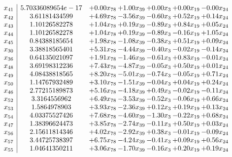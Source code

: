 \documentclass[8pt]{article}
\begin{document}
\[\begin{array}{c| c c@{\hskip 2pt} c@{\hskip 2pt} c@{\hskip 2pt} c@{\hskip 2pt} c@{\hskip 2pt} }
 x_{41}   &  5.70336089654e-17 & +  0.00 x_{78} & +  1.00 x_{39} & +  0.00 x_{3} & +  0.00 x_{19} & -0.00 x_{24}\\
 x_{42}   &  3.61181434599 & +  4.69 x_{78} & -3.56 x_{39} & -0.60 x_{3} & +  0.52 x_{19} & +  0.14 x_{24}\\
 x_{43}   &  1.10126582278 & +  1.04 x_{78} & +  0.19 x_{39} & -0.89 x_{3} & +  0.84 x_{19} & +  0.05 x_{24}\\
 x_{44}   &  1.10126582278 & +  1.04 x_{78} & +  0.19 x_{39} & -0.89 x_{3} & -0.16 x_{19} & +  1.05 x_{24}\\
 x_{45}   &  0.84388185654 & +  1.98 x_{78} & -1.08 x_{39} & -0.38 x_{3} & +  0.51 x_{19} & +  0.09 x_{24}\\
 x_{30}   &  3.38818565401 & +  5.31 x_{78} & -4.44 x_{39} & -0.40 x_{3} & -0.02 x_{19} & -0.14 x_{24}\\
 x_{36}   &  0.64135021097 & +  1.91 x_{78} & -1.46 x_{39} & -0.61 x_{3} & +  0.83 x_{19} & -0.01 x_{24}\\
 x_{48}   &  3.69198312236 & +  7.43 x_{78} & -4.87 x_{39} & -0.05 x_{3} & +  0.50 x_{19} & +  0.01 x_{24}\\
 x_{49}   &  4.08438818565 & +  8.20 x_{78} & -5.01 x_{39} & -0.74 x_{3} & -0.05 x_{19} & +  0.71 x_{24}\\
 x_{50}   &  1.14767932489 & +  3.10 x_{78} & -1.51 x_{39} & -0.04 x_{3} & +  0.04 x_{19} & +  0.24 x_{24}\\
 x_{46}   &  2.77215189873 & +  5.16 x_{78} & -4.18 x_{39} & +  0.49 x_{3} & -0.02 x_{19} & -0.11 x_{24}\\
 x_{52}   &  3.3164556962 & +  6.49 x_{78} & -3.53 x_{39} & -0.52 x_{3} & -0.06 x_{19} & +  0.66 x_{24}\\
 x_{53}   &  1.5864978903 & +  3.93 x_{78} & -2.36 x_{39} & +  0.12 x_{3} & +  0.19 x_{19} & +  0.13 x_{24}\\
 x_{54}   &  4.03375527426 & +  7.68 x_{78} & -4.60 x_{39} & -1.30 x_{3} & -0.22 x_{19} & +  0.68 x_{24}\\
 x_{47}   &  1.38396624473 & +  3.85 x_{78} & -2.74 x_{39} & -0.11 x_{3} & +  0.50 x_{19} & +  0.03 x_{24}\\
 x_{56}   &  2.15611814346 & +  4.02 x_{78} & -2.92 x_{39} & +  0.38 x_{3} & -0.01 x_{19} & -0.09 x_{24}\\
 x_{57}   &  3.44725738397 & +  6.75 x_{78} & -4.24 x_{39} & -0.41 x_{3} & +  0.09 x_{19} & +  0.56 x_{24}\\
 x_{55}   &  1.04641350211 & +  3.06 x_{78} & -1.70 x_{39} & -0.16 x_{3} & +  0.20 x_{19} & +  0.19 x_{24}\\

\end{array}\]
\end{document}
